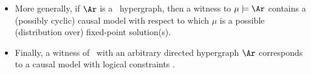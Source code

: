 {\begin{itemize}[wide]
        From this perspective, \cref{theorem:bns} can be viewed as result 
            that implicitly undergirds much of the work on causality:
        every acyclic causal model with independent per-variable noise induces a distribution with the independencies of the appropriate Bayesian Network---%
        and, conversely,
        every distribution with those independencies
        arises from such a causal model.
    \item
    More generally, if $\Ar$ is a \partl\ hypergraph,
        then a witness to 
        $\mu \models \Ar$ 
        contains a (possibly cyclic) causal model 
        with respect to which $\mu$ is a possible 
        (distribution over) fixed-point solution(s).    
    
    \item 
    Finally, a witness of \scibility\ with an arbitrary directed hypergraph $\Ar$
    corresponds to a causal model with logical constraints \citep{beckers2023causal}.
\end{itemize}
}

